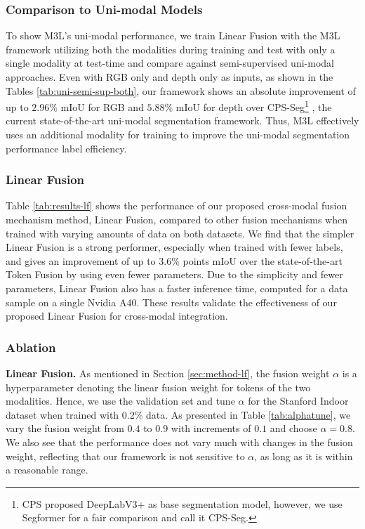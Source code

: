 \documentclass[10pt,twocolumn,letterpaper]{article}
\begin{document}
\subsubsection{Comparison to Uni-modal Models}

\label{sec:results-uni-semi-sup}

To show M3L's uni-modal performance, we train Linear Fusion with the M3L framework utilizing both the modalities during training and test with only a single modality at test-time and compare against semi-supervised uni-modal approaches. Even with RGB only and depth only as inputs, as shown in the Tables \ref{tab:uni-semi-sup-both}, our framework shows an absolute improvement of up to $2.96\%$ mIoU for RGB and $5.88\%$ mIoU for depth over CPS-Seg\footnote{\label{note:cps-seg}CPS\cite{chen2021-CPS} proposed DeepLabV3+\cite{chen2017rethinking} as base segmentation model, however, we use Segformer \cite{segformer} for a fair comparison and call it CPS-Seg.} \cite{chen2021-CPS}, the current state-of-the-art uni-modal segmentation framework. Thus, M3L effectively uses an additional modality for training to improve the uni-modal segmentation performance label efficiency.



\subsubsection{Linear Fusion}
\label{sec:results-lf}

Table \ref{tab:results-lf} shows the performance of our proposed cross-modal fusion mechanism method, Linear Fusion, compared to other fusion mechanisms when trained with varying amounts of data on both datasets. We find that the simpler Linear Fusion is a strong performer, especially when trained with fewer labels, and gives an improvement of up to $3.6\%$ points mIoU over the state-of-the-art Token Fusion \cite{tokenfusion} by using even fewer parameters. Due to the simplicity and fewer parameters, Linear Fusion also has a faster inference time, computed for a data sample on a single Nvidia A40. These results validate the effectiveness of our proposed Linear Fusion for cross-modal integration.


\subsubsection{Ablation}
\label{sec:results-ablation}
\noindent\textbf{Linear Fusion.}
As mentioned in Section \ref{sec:method-lf}, the fusion weight $\alpha$ is a hyperparameter denoting the linear fusion weight for tokens of the two modalities. Hence, we use the validation set and tune $\alpha$ for the Stanford Indoor dataset \cite{stanfordindoor} when trained with 0.2\% data. As presented in Table \ref{tab:alphatune}, we vary the fusion weight from $0.4$ to $0.9$ with increments of $0.1$ and choose $\alpha=0.8$. We also see that the performance does not vary much with changes in the fusion weight, reflecting that our framework is not sensitive to $\alpha$, as long as it is within a reasonable range.
\end{document}
